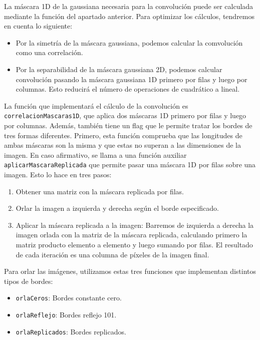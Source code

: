 \documentclass[10pt,a4paper]{article}
\begin{document}
\begin{list}{•}{}
La máscara 1D de la gaussiana necesaria para la convolución puede ser calculada mediante la función del apartado anterior. Para optimizar los cálculos, tendremos en cuenta lo siguiente:

\begin{itemize}
\item Por la simetría de la máscara gaussiana, podemos calcular la comvolución como una correlación.
\item Por la separabilidad de la máscara gaussiana 2D, podemos calcular convolución pasando la máscara gaussiana 1D primero por filas y luego por columnas. Esto reducirá el número de operaciones de cuadrático a lineal.
\end{itemize}

La función que implementará el cálculo de la convolución es \texttt{correlacionMascaras1D}, que aplica dos máscaras 1D primero por filas y luego por columnas. Además, también tiene un flag que le permite tratar los bordes de tres formas diferentes. Primero, esta función comprueba que las longitudes de ambas máscaras son la misma y que estas no superan a las dimensiones de la imagen. En caso afirmativo, se llama a una función auxiliar \texttt{aplicarMascaraReplicada} que permite pasar una máscara 1D por filas sobre una imagen. Esto lo hace en tres pasos:

\begin{enumerate}
\item Obtener una matriz con la máscara replicada por filas.
\item Orlar la imagen a izquierda y derecha según el borde especificado.
\item Aplicar la máscara replicada a la imagen: Barremos de izquierda a derecha la imagen orlada con la matriz de la máscara replicada, calculando primero la matriz producto elemento a elemento y luego sumando por filas. El resultado de cada iteración es una columna de píxeles de la imagen final.
\end{enumerate}

Para orlar las imágenes, utilizamos estas tres funciones que implementan distintos tipos de bordes:
\begin{itemize}
\item \texttt{orlaCeros}: Bordes constante cero.
\item \texttt{orlaReflejo}: Bordes reflejo 101.
\item \texttt{orlaReplicados}: Bordes replicados.
\end{itemize}


\end{list}
\end{document}
